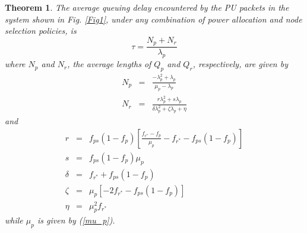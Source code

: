\documentclass[journal,twocolumn]{IEEEtran}
\newtheorem{theorem}{Theorem}
\begin{document}
\begin{theorem}\label{Thm2}
The average queuing delay encountered by the PU packets in the system shown in Fig. \ref{Fig1}, under any combination of power
allocation and node selection policies, is
\begin{equation}\label{tau}
\tau= \frac{N_{p} + N_{r}}{\lambda_{p}}
\end{equation}
where $N_{p}$ and $N_{r}$, the average lengths of $Q_{p}$ and $Q_{r}$, respectively, are given by
\begin{eqnarray}
N_{p}&=&\frac{-\lambda_{p}^{2} + \lambda_{p}}{\mu_{p}-\lambda_{p}}\label{pk} \\
N_{r}&=& \frac{r \lambda_{p}^{2} + s \lambda_{p}}{\delta \lambda_{p}^{2} + \zeta \lambda_{p} + \eta}\label{Nr}
\end{eqnarray}
and
\begin{eqnarray}
r&=&f_{ps}(1-f_{p}) \left[ \frac{f_{r^*}-f_{p}}{\mu_{p}}- f_{r^*}-f_{ps}(1-f_{p}) \right]\\
s &=& f_{ps}(1-f_{p})\mu_{p}\\
\delta &=& f_{r^*} + f_{ps}(1-f_{p})\\
\zeta &=& \mu_{p} \left[ -2f_{r^*}-f_{ps}(1-f_{p}) \right]\\
\eta &=& \mu_{p}^{2} f_{r^*}
\end{eqnarray}
while $\mu_{p}$ is given by (\ref{mu_p}).
\end{theorem}
\end{document}
